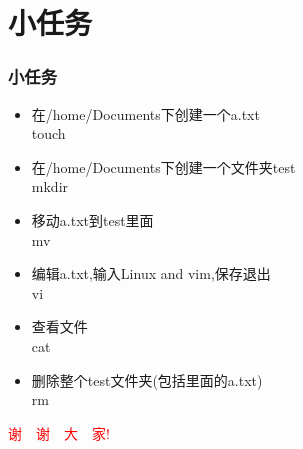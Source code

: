 \documentclass[notheorems,serif]{beamer}
\begin{document}
\section{小任务}
\begin{frame}
\frametitle{小任务}
\begin{itemize}
\item 在/home/Documents下创建一个a.txt
\\touch
\item 在/home/Documents下创建一个文件夹test
\\mkdir
\item 移动a.txt到test里面
\\mv
\item 编辑a.txt,输入Linux and vim,保存退出
\\vi
\item 查看文件
\\cat
\item 删除整个test文件夹(包括里面的a.txt)
\\rm
\end{itemize}
\end{frame}

\begin{frame}
\begin{center}
\Huge \textcolor{red}{谢~~谢~~大~~家!}
\end{center}
\end{frame}
\end{document}
